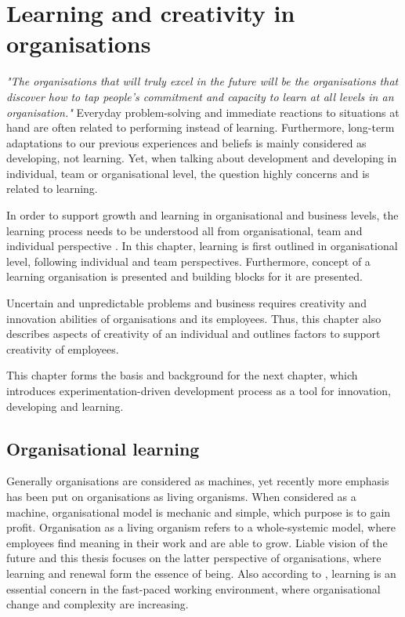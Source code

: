 \chapter{Learning and creativity in organisations} \label{learning}
\textit{"The organisations that will truly excel in the future will be the organisations that discover how to tap people's commitment and capacity to learn at all levels in an organisation."} \citep{senge1990fifth} 
\newline
\newline
Everyday problem-solving and immediate reactions to situations at hand are often related to performing instead of learning. Furthermore, long-term adaptations to our previous experiences and beliefs is mainly considered as developing, not learning. Yet, when talking about development and developing in individual, team or organisational level, the question highly concerns and is related to learning. \citep{kolb1984experiential}

In order to support growth and learning in organisational and business levels, the learning process needs to be understood all from organisational, team and individual perspective \citep{buijs2007innovation}. In this chapter, learning is first outlined in organisational level, following individual and team perspectives. Furthermore, concept of a learning organisation is presented and building blocks for it are presented. 

Uncertain and unpredictable problems and business requires creativity and innovation abilities of organisations and its employees. Thus, this chapter also describes aspects of creativity of an individual and outlines factors to support creativity of employees. 

This chapter forms the basis and background for the next chapter, which introduces experimentation-driven development process as a tool for innovation, developing and learning. 

\section{Organisational learning}
Generally organisations are considered as machines, yet recently more emphasis has been put on organisations as living organisms. When considered as a machine, organisational model is mechanic and simple, which purpose is to gain profit. Organisation as a living organism refers to a whole-systemic model, where employees find meaning in their work and are able to grow. Liable vision of the future and this thesis focuses on the latter perspective of organisations, where learning and renewal form the essence of being. \citep{geus1997living}  Also according to \citet{edmondson1999psychological}, learning is an essential concern in the fast-paced working environment, where organisational change and complexity are increasing.  

